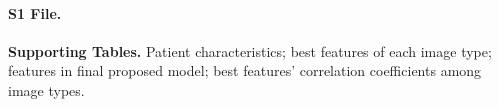 \documentclass[10pt,letterpaper]{article}
\begin{document}
%

\paragraph*{S1 File.}
\label{S1_File}
{\bf Supporting Tables.}
Patient characteristics; best features of each image type; features in final
proposed model; best features' correlation coefficients among image types.
\end{document}
